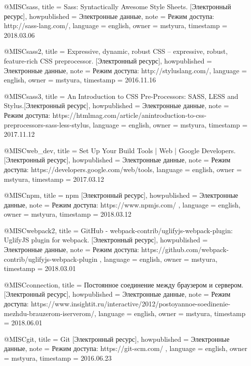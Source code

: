    @MISC{sass,
  title = {Sass: Syntactically Awesome Style Sheets.  [Электронный ресурс]},
  howpublished = {Электронные данные},
  note = {Режим доступа: http://sass-lang.com/},
  language = {english},
  owner = {mstyura},
  timestamp = {2018.03.06} 
  }

  @MISC{sass2,
  title = {Expressive, dynamic, robust CSS – expressive, robust, feature-rich CSS
preprocessor. [Электронный ресурс]},
  howpublished = {Электронные данные},
  note = {Режим доступа: http://styluslang.com/},
  language = {english},
  owner = {mstyura},
  timestamp = {2016.11.16} 
  }

  @MISC{sass3,
  title = {An Introduction to CSS Pre-Processors: SASS, LESS and Stylus.[Электронный ресурс]},
  howpublished = {Электронные данные},
  note = {Режим доступа:  https://htmlmag.com/article/anintroduction-to-css-preprocessors-sass-less-stylus},
  language = {english},
  owner = {mstyura},
  timestamp = {2017.11.12} 
  }

  @MISC{web_dev,
  title = {Set Up Your Build Tools | Web | Google Developers. [Электронный ресурс]},
  howpublished = {Электронные данные},
  note = {Режим доступа:  https://developers.google.com/web/tools},
  language = {english},
  owner = {mstyura},
  timestamp = {2017.03.12} 
  }

   @MISC{npm,
  title = {npm [Электронный ресурс]},
  howpublished = {Электронные данные},
  note = {Режим доступа: https://www.npmjs.com/ },
  language = {english},
  owner = {mstyura},
  timestamp = {2018.03.12} 
  }

  @MISC{webpack2,
  title = {GitHub - webpack-contrib/uglifyjs-webpack-plugin: UglifyJS plugin for
webpack.  [Электронный ресурс]},
  howpublished = {Электронные данные},
  note = {Режим доступа: https://github.com/webpack-contrib/uglifyjs-webpack-plugin  },
  language = {english},
  owner = {mstyura},
  timestamp = {2018.03.01} 
  }

  @MISC{connection,
  title = {Постоянное соединение между браузером и сервером. [Электронный ресурс]},
  howpublished = {Электронные данные},
  note = {Режим доступа: https://www.insightit.ru/interactive/2012/postoyannoe-soedinenie-mezhdu-brauzerom-iserverom/},
  language = {english},
  owner = {mstyura},
  timestamp = {2018.06.01} 
  }

  @MISC{git,
  title = {Git [Электронный ресурс]},
  howpublished = {Электронные данные},
  note = {Режим доступа: https://git-scm.com/ },
  language = {english},
  owner = {mstyura},
  timestamp = {2016.06.23} 
  }

